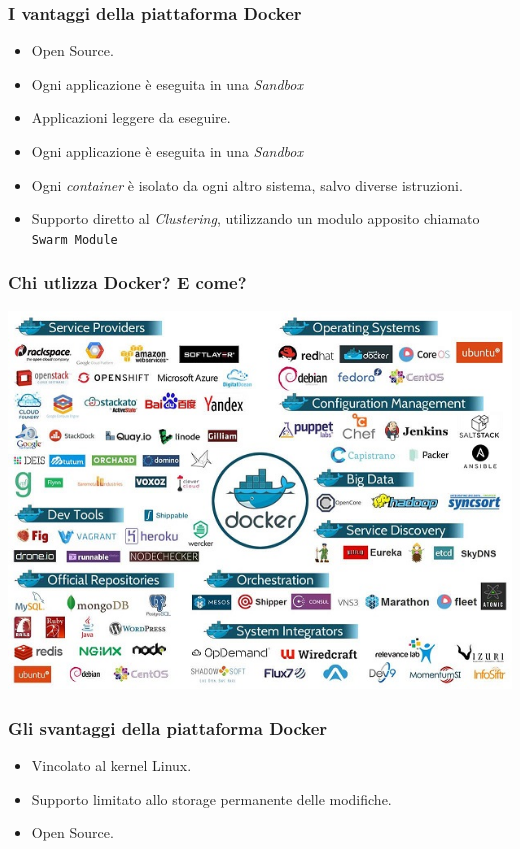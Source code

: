\documentclass{beamer}
\begin{document}
\begin{frame}
\frametitle{I vantaggi della piattaforma Docker}
\begin{itemize}
\item Open Source.
\item Ogni applicazione è eseguita in una \textit{Sandbox}
\item Applicazioni leggere da eseguire.
\item Ogni applicazione è eseguita in una \textit{Sandbox}
\item Ogni \textit{container} è isolato da ogni altro sistema, salvo diverse istruzioni.
\item Supporto diretto al \textit{Clustering}, utilizzando un modulo apposito chiamato \texttt{Swarm Module}
\end{itemize}
\end{frame}

\begin{frame}
\frametitle{ Chi utlizza Docker? E come?}
\centering\includegraphics{pic4}
\end{frame}

\begin{frame}
\frametitle{Gli svantaggi della piattaforma Docker}
\begin{itemize}
\item Vincolato al kernel Linux.
\item Supporto limitato allo storage permanente delle modifiche.
\item Open Source.
\end{itemize}
\end{frame}
\end{document}
